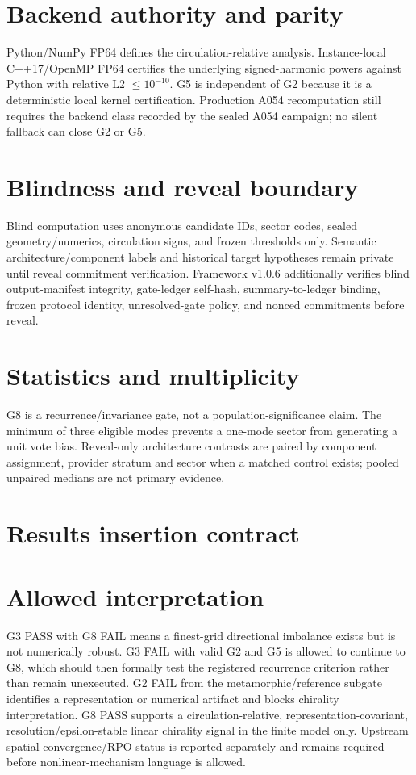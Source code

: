 \documentclass[11pt,a4paper]{article}
\begin{document}
\section{Backend authority and parity}
Python/NumPy FP64 defines the circulation-relative analysis. Instance-local C++17/OpenMP FP64 certifies the underlying signed-harmonic powers against Python with relative L2 $\le10^{-10}$. G5 is independent of G2 because it is a deterministic local kernel certification. Production A054 recomputation still requires the backend class recorded by the sealed A054 campaign; no silent fallback can close G2 or G5.
\section{Blindness and reveal boundary}
Blind computation uses anonymous candidate IDs, sector codes, sealed geometry/numerics, circulation signs, and frozen thresholds only. Semantic architecture/component labels and historical target hypotheses remain private until reveal commitment verification. Framework v1.0.6 additionally verifies blind output-manifest integrity, gate-ledger self-hash, summary-to-ledger binding, frozen protocol identity, unresolved-gate policy, and nonced commitments before reveal.
\section{Statistics and multiplicity}
G8 is a recurrence/invariance gate, not a population-significance claim. The minimum of three eligible modes prevents a one-mode sector from generating a unit vote bias. Reveal-only architecture contrasts are paired by component assignment, provider stratum and sector when a matched control exists; pooled unpaired medians are not primary evidence.
\section{Results insertion contract}
\section{Allowed interpretation}
G3 PASS with G8 FAIL means a finest-grid directional imbalance exists but is not numerically robust. G3 FAIL with valid G2 and G5 is allowed to continue to G8, which should then formally test the registered recurrence criterion rather than remain unexecuted. G2 FAIL from the metamorphic/reference subgate identifies a representation or numerical artifact and blocks chirality interpretation. G8 PASS supports a circulation-relative, representation-covariant, resolution/epsilon-stable linear chirality signal in the finite model only. Upstream spatial-convergence/RPO status is reported separately and remains required before nonlinear-mechanism language is allowed.
\end{document}
